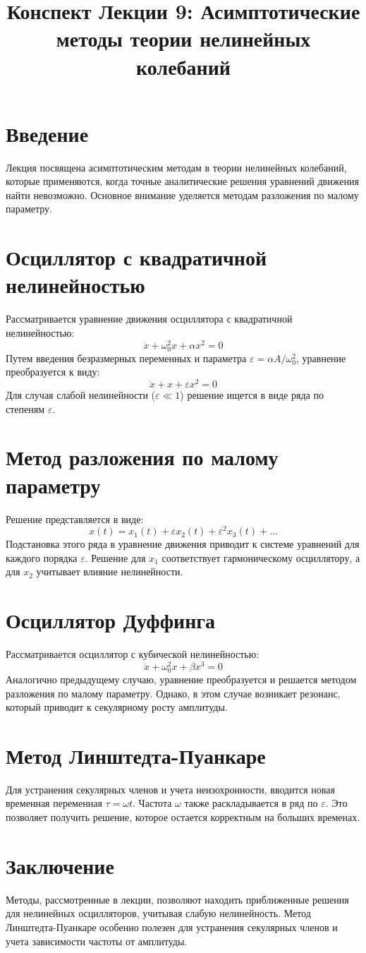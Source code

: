 \documentclass[10pt]{article}
\begin{document}
\title{Конспект Лекции 9: Асимптотические методы теории нелинейных колебаний}
\author{}
\date{}
\maketitle

\section*{Введение}
Лекция посвящена асимптотическим методам в теории нелинейных колебаний, которые применяются, когда точные аналитические решения уравнений движения найти невозможно. Основное внимание уделяется методам разложения по малому параметру.

\section*{Осциллятор с квадратичной нелинейностью}
Рассматривается уравнение движения осциллятора с квадратичной нелинейностью:
\[
\ddot{x} + \omega_{0}^{2} x + \alpha x^{2} = 0
\]
Путем введения безразмерных переменных и параметра $\varepsilon = \alpha A / \omega_{0}^{2}$, уравнение преобразуется к виду:
\[
\ddot{x} + x + \varepsilon x^{2} = 0
\]
Для случая слабой нелинейности ($\varepsilon \ll 1$) решение ищется в виде ряда по степеням $\varepsilon$.

\section*{Метод разложения по малому параметру}
Решение представляется в виде:
\[
x(t) = x_{1}(t) + \varepsilon x_{2}(t) + \varepsilon^{2} x_{3}(t) + \ldots
\]
Подстановка этого ряда в уравнение движения приводит к системе уравнений для каждого порядка $\varepsilon$. Решение для $x_{1}$ соответствует гармоническому осциллятору, а для $x_{2}$ учитывает влияние нелинейности.

\section*{Осциллятор Дуффинга}
Рассматривается осциллятор с кубической нелинейностью:
\[
\ddot{x} + \omega_{0}^{2} x + \beta x^{3} = 0
\]
Аналогично предыдущему случаю, уравнение преобразуется и решается методом разложения по малому параметру. Однако, в этом случае возникает резонанс, который приводит к секулярному росту амплитуды.

\section*{Метод Линштедта-Пуанкаре}
Для устранения секулярных членов и учета неизохронности, вводится новая временная переменная $\tau = \omega t$. Частота $\omega$ также раскладывается в ряд по $\varepsilon$. Это позволяет получить решение, которое остается корректным на больших временах.

\section*{Заключение}
Методы, рассмотренные в лекции, позволяют находить приближенные решения для нелинейных осцилляторов, учитывая слабую нелинейность. Метод Линштедта-Пуанкаре особенно полезен для устранения секулярных членов и учета зависимости частоты от амплитуды.
\end{document}
